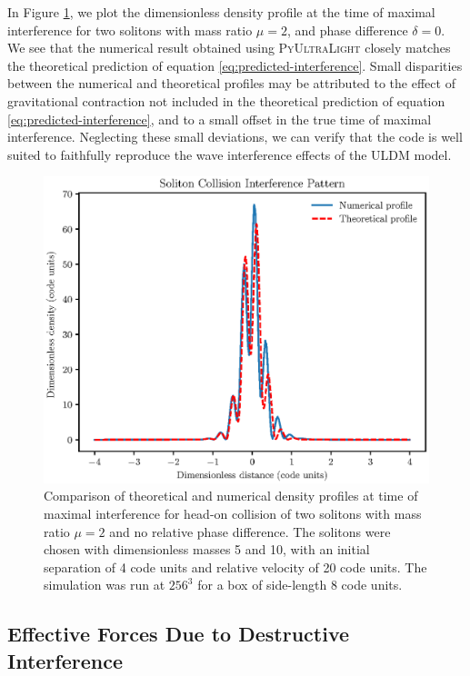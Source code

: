 \documentclass[a4paper,11pt]{article}
\newcommand{\PyUltraLight}{\textsc{PyUltraLight }}
\begin{document}
In Figure \ref{fig:interference}, we plot the dimensionless density profile at the time of maximal interference for two solitons with mass ratio $\mu=2$, and phase difference $\delta=0$. We see that the numerical result obtained using \PyUltraLight closely matches the theoretical prediction of equation \ref{eq:predicted-interference}. Small disparities between the numerical and theoretical profiles may be attributed to the effect of gravitational contraction not included in the theoretical prediction of equation \ref{eq:predicted-interference}, and to a small offset in the true time of maximal interference. Neglecting these small deviations, we can verify that the code is well suited to faithfully reproduce the wave interference effects of the ULDM model. 
\begin{figure}
  \includegraphics[trim={0 0 0 0.9cm},clip, scale=0.9]{interference_patterns}
  \caption{Comparison of theoretical and numerical density profiles at time of maximal interference for head-on collision of two solitons with mass ratio $\mu=2$ and no relative phase difference. The solitons were chosen with dimensionless masses 5 and 10, with an initial separation of 4 code units and relative velocity of 20 code units. The simulation was run at $256^3$ for a box of side-length 8 code units.}
  \label{fig:interference}
\end{figure}


\subsection{Effective Forces Due to Destructive Interference}
\end{document}
